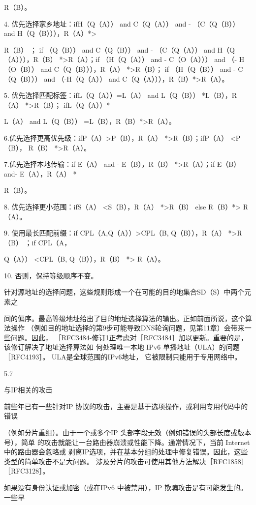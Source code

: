 R（B）。

4. 优先选择家乡地址：ifH（Q（A）） and C（Q（A）） and - （C（Q（B）） and H（Q（B））），R（A）*>

R（B） ； if （Q（B）） and C（Q（B）） and - （C（Q（A）） and H（Q（A））），R（B） *>R（A）；if （H（Q（A）） and -
C（O（A））） and （- H（O（B）） and C（Q（B））），R（A） *>R（B）； if （H（Q（B）） and - C（Q（B））） and （-H（Q（A））
and C（Q（A））），R（B）*>R（A）。

5. 优先选择匹配标签：ifL（Q（A））=L（A） and L（Q（B）） *L（B），R（A） *>R（B）； ifL（Q（A））*

L（A） and L（Q（B）） =L（B），R（B）*>R（A）。

6.优先选择更高优先级：ifP（A）>P（B），R（A） *>R（B）；ifP（A） <P（B）， R（B） *>R（A）。

7.优先选择本地传输：if E（A） and - E（B），R（B） *>R（A）；if E（B） and- E（A），R（A） *

R（B）。

8. 优先选择更小范围：ifS（A） <S（B），R（A） *>R（B） else R（B）*> R（A）。

9. 使用最长匹配前缀：if CPL（A,Q（A））>CPL（B, Q（B）），R（A） *>R（B） ；if CPL（A，

Q（A）） <CPL（B, Q（B）），R（B） *> R（A）。

10. 否则，保持等级顺序不变。

针对源地址的选择问题，这些规则形成一个在可能的目的地集合SD（S）中两个元素之

间的偏序。最高等级地址给出了目的地址选择算法的输出。正如前面所说，这个算法操作
（例如目的地址选择的第9步可能导致DNS轮询问题，见第11章）会带来一些问题。因此，
［RFC3484-修订1正考虑对［RFC3484］加以更新。重要的是，该修订解决了地址选择算法如
何处理唯一本地 IPv6 单播地址（ULA）的问题［RFC4193］。 ULA是全球范围的IPv6地址，
它被限制只能用于专用网络中。

5.7

与IP相关的攻击

前些年已有一些针对IP 协议的攻击，主要是基于选项操作，或利用专用代码中的错误

（例如分片重组）。由于一个或多个IP 头部字段无效（例如错误的头部长度或版本号），简单
的攻击就能让一台路由器崩溃或性能下降。通常情况下，当前 Internet 中的路由器会忽略或
剥离IP选项，并在基本分组的处理中修复错误。因此，这些类型的简单攻击不是大问题。
涉及分片的攻击可使用其他方法解决［RFC1858］ ［RFC3128］。

如果没有身份认证或加密（或在IPv6 中被禁用），IP 欺骗攻击是有可能发生的。一些早

